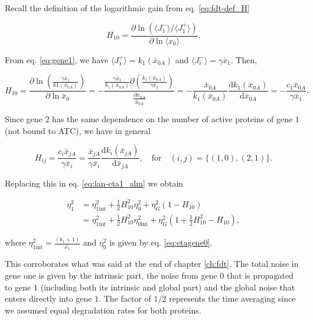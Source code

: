 Recall the definition of the logarithmic gain from eq. \eqref{eq:fdt-def_H}

\begin{equation*}
  H_{10} = \frac{\partial \ln (\langle J_1^-\rangle/\langle J_1^+\rangle)}{\partial \ln \langle x_0\rangle}.
\end{equation*}

From eq. \eqref{eq:gene1}, we have $\langle J_1^+\rangle = k_1(\bar{x}_{0A})$ and $\langle J_i^-\rangle = \gamma \bar{x}_1$. Then,

\begin{equation*}
  H_{10} = \frac{\partial \ln\left(\frac{\gamma\bar{x}_1}{k1(\bar{x}_{0A})}\right)}{\partial \ln  \bar{x}_0} = -\frac{\frac{\gamma \bar{x}_1}{k_1(\bar{x}_{0A})}\partial\left(\frac{k_1(\bar{x}_{0A})}{\gamma \bar{x}_1}\right)}{\frac{\partial \bar{x}_{0A}}{\bar{x}_{0A}}} = -\frac{\bar{x}_{0A}}{k_1(\bar{x}_{0A})}\frac{\mathrm{d} k_1(\bar{x}_{0A})}{\mathrm{d} \bar{x}_{0A}} = -\frac{c_1 \bar{x}_{0A}}{\gamma\bar{x}_1}.
\end{equation*}

Since gene $2$ has the same dependence on the number of active proteins of gene $1$ (not bound to ATC), we have in general

\begin{equation}
  \label{lan-Hexp}
  H_{ij} = \frac{c_i \bar{x}_{jA}}{\gamma\bar{x}_i} = \frac{\bar{x}_{jA}}{\gamma\bar{x}_i}\frac{\mathrm{d}k_i(\bar{x}_{jA})}{\mathrm{d} \bar{x}_{jA}},\quad\text{for}\quad (i,j) = \{(1,0),(2,1)\}.
\end{equation}

Replacing this in eq. \eqref{eq:lan-eta1_alm} we obtain

\begin{equation}
  \label{eq:etagene1}
  \begin{split}
    \eta_1^2 &= \eta_{1\text{int}}^2 + \frac{1}{2}H_{10}^2\eta_0^2+\eta_G^2\left(1-H_{10}\right)\\
    &= \eta_{1\text{int}}^2+\frac{1}{2}H_{10}^2\eta_{0\text{int}}^2+\eta_G^2\left(1+ \frac{1}{2}H_{10}^2-H_{10}\right),
  \end{split}
\end{equation}

where $\eta_{1\text{int}}^2 = \frac{(b_1+1)}{\bar{x_1}}$ and $\eta_0^2$ is given by eq. \ref{eq:etagene0}.

This corroborates what was said at the end of chapter \ref{ch:fdt}. The total noise in gene one is given by the intrinsic part, the noise from gene $0$ that is propagated to gene $1$ (including both its intrinsic and global part) and the global noise that enters directly into gene $1$. The factor of $1/2$ represents the time averaging since we assumed equal degradation rates for both proteins.

